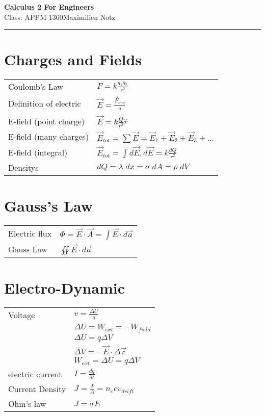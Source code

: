\documentclass[5pt]{article}
\begin{document}
\begin{center}
     \Large{\textbf{Calculus 2 For Engineers}}\\
     \small{Class: APPM 1360}\hfill\small{\textcopyright Maximilien Notz \the\year{}}
     \noindent\rule{20.2cm}{0.4pt}
\end{center}


\begin{multicols}{2}
\setcounter{secnumdepth}{0}


\section{Charges and Fields}
\begin{tabular}{ll}
    Coulomb's Law & $F=k\frac{q_1q_2}{r^2}$ \\
    Definition of electric & $\Vec{E}=\frac{\Vec{F}_{on q}}{q}$\\
    E-field \footnotesize{(point charge)} & $\Vec{E}=k\frac{Q}{r^2}\hat{r}$\\
    E-field \footnotesize{(many charges)} & $\Vec{E}_{tot}=\sum\Vec{E}=\Vec{E}_1+\Vec{E}_2+\Vec{E}_3+...$\\ 
    E-field \footnotesize{(integral)} & $\Vec{E}_{tot}=\int d\Vec{E}, d\Vec{E}=k\frac{dQ}{r^2}$\\
    Densitys & $dQ=\lambda\;dx=\sigma\;dA=\rho\;dV$
\end{tabular}

\section{Gauss's Law}
\begin{tabular}{ll}
Electric flux & $\Phi=\Vec{E}\cdot\Vec{A}=\int\Vec{E}\cdot d\Vec{a}$\\
Gauss Law & $\oiint\Vec{E}\cdot d\Vec{a}$
\end{tabular}
\section{Electro-Dynamic}
\begin{tabular}{ll}
Voltage          & $v=\frac{\Delta U}{q}$\\
                 & $\Delta U = W_{ext}=- W_{field}$\\
                 & $\Delta U = q\Delta V$\\
                 & $\Delta V=-\Vec{E}\cdot\Delta\Vec{r}$\\
                 & $W_{ext}=\Delta U =q\Delta V$\\
electric current & $I=\frac{dq}{dt}$\\
Current Density  & $J=\frac{I}{A}=n_eev_{drift}$\\
Ohm's law        & $J=\sigma E$
\end{tabular}


\end{multicols}
\end{document}
